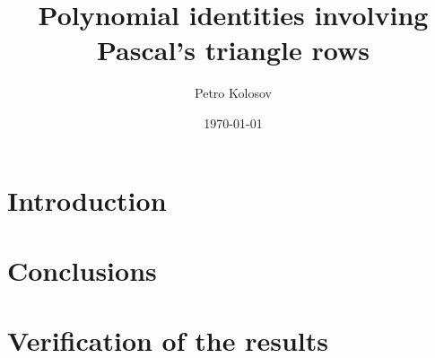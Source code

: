 \documentclass[12pt,letterpaper,oneside,reqno]{amsart}
\title[Polynomial identities involving Pascal's triangle rows]
{Polynomial identities involving Pascal's triangle rows}
\author[Petro Kolosov]{Petro Kolosov}
\date{\today}
\numberwithin{equation}{section}
\begin{document}
    \begin{abstract}
        
    \end{abstract}

    \maketitle

    \tableofcontents


    \section{Introduction} \label{sec:introduction}
    


    \section{Conclusions}\label{sec:conclusions}
    

    \section{Verification of the results}\label{sec:verification}
    

    
    
\end{document}
